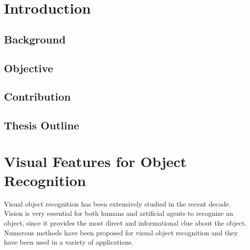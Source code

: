 \documentclass[12pt,final,twoside]{report}
\theoremstyle{plain}
\theoremstyle{definition}
\theoremstyle{remark}
\begin{document}

\chapter{Introduction}
\section{Background}
\section{Objective}
\section{Contribution}
\section{Thesis Outline}


\cleardoublepage
\chapter{Visual Features for Object Recognition}
Visual object recognition has been extensively studied in the recent decade. Vision is very essential for both humans and artificial agents to recognize an object, since it provides the most direct and informational clue about the object. Numerous methods have been proposed for visual object recognition and they have been used in a variety of applications.
\end{document}
